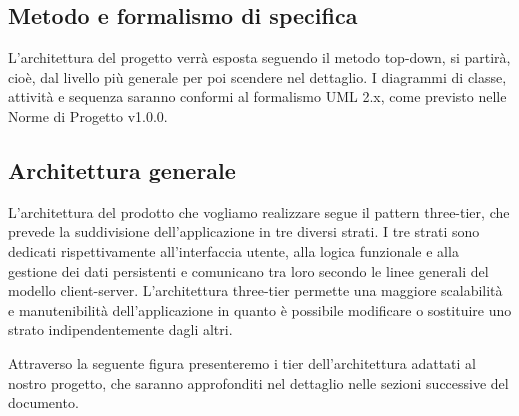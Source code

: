 \subsection{Metodo e formalismo di specifica}
L'architettura del progetto verrà esposta seguendo il metodo \gls{top-down}, si partirà, cioè, dal livello più generale per poi scendere nel dettaglio. I diagrammi di classe, attività e sequenza saranno conformi al formalismo \gls{UML} 2.x, come previsto nelle Norme di Progetto v1.0.0.

\subsection{Architettura generale}
L'architettura del prodotto che vogliamo realizzare segue il pattern three-tier, che prevede la suddivisione dell'applicazione in tre diversi strati. I tre strati sono dedicati rispettivamente all'interfaccia utente, alla logica funzionale e alla gestione dei dati persistenti e comunicano tra loro secondo le linee generali del modello client-server. L'architettura three-tier permette una maggiore scalabilità e manutenibilità dell'applicazione in quanto è possibile modificare o sostituire uno strato indipendentemente dagli altri.

Attraverso la seguente figura presenteremo i tier dell'architettura adattati al nostro progetto, che saranno approfonditi nel dettaglio nelle sezioni successive del documento.

